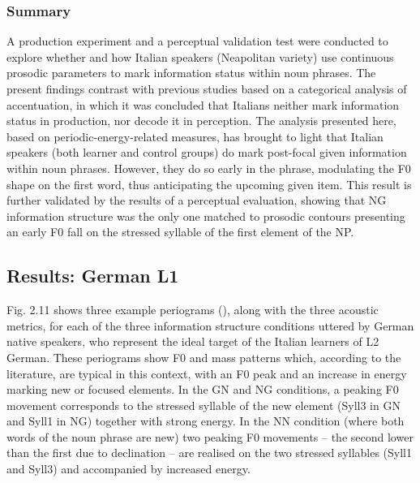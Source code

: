 \subsubsection{Summary}
\hypertarget{Toc191305905}{}
A production experiment and a perceptual validation test were conducted to explore whether and how Italian speakers (Neapolitan variety) use continuous prosodic parameters to mark information status within noun phrases. The present findings contrast with previous studies based on a categorical analysis of accentuation, in which it was concluded that Italians neither mark information status in production, nor decode it in perception. The analysis presented here, based on periodic-energy-related measures, has brought to light that Italian speakers (both learner and control groups) do mark post-focal given information within noun phrases. However, they do so early in the phrase, modulating the F0 shape on the first word, thus anticipating the upcoming given item. This result is further validated by the results of a perceptual evaluation, showing that NG information structure was the only one matched to prosodic contours presenting an early F0 fall on the stressed syllable of the first element of the NP.

\subsection{}
\subsection{Results: German L1}
\hypertarget{Toc191305906}{}
Fig. 2.11 shows three example periograms (), along with the three acoustic metrics, for each of the three information structure conditions uttered by German native speakers, who represent the ideal target of the Italian learners of L2 German. These periograms show F0 and mass patterns which, according to the literature, are typical in this context, with an F0 peak and an increase in energy marking new or focused elements. In the GN and NG conditions, a peaking F0 movement corresponds to the stressed syllable of the new element (Syll3 in GN and Syll1 in NG) together with strong energy. In the NN condition (where both words of the noun phrase are new) two peaking F0 movements – the second lower than the first due to declination – are realised on the two stressed syllables (Syll1 and Syll3) and accompanied by increased energy.

  
 

